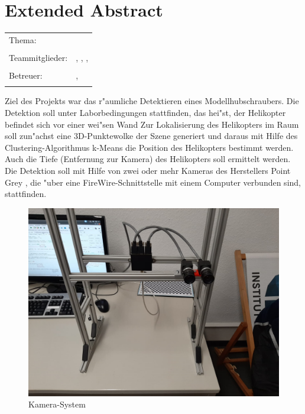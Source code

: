 \chapter*{Extended Abstract}

\begin{center}
	\begingroup
	\renewcommand*{\arraystretch}{1}
	{\makeatletter	
		\begin{tabular}{p{3.2cm}p{9.6cm}}
			Thema: & \thema \\
			& \\
			Teammitglieder: & \verfasserA, \verfasserB, 
			\verfasserC, \verfasserD\\
			& \\
			Betreuer: & \hoschschule \newline \institut \newline \prueferA, \prueferB \\
			& \\
		\end{tabular}
		
		\makeatother}
	\endgroup
\end{center}

\bigskip

\noindent
Ziel des Projekts war das r"aumliche Detektieren eines Modellhubschraubers. Die Detektion soll unter Laborbedingungen stattfinden, das hei"st, der Helikopter befindet sich vor einer wei"sen Wand
Zur Lokalisierung des Helikopters im Raum soll zun"achst eine 3D-Punktewolke der Szene generiert und daraus mit Hilfe des Clustering-Algorithmus k-Means die Position des Helikopters bestimmt werden. Auch die Tiefe (Entfernung zur Kamera) des Helikopters soll ermittelt werden. Die Detektion soll mit Hilfe von zwei oder mehr Kameras des Herstellers Point Grey , die "uber eine FireWire-Schnittstelle mit einem Computer verbunden sind, stattfinden.

\begin{figure}[H]
	\includegraphics[scale=0.3]{bilder/camerasystem}
	\caption[Kamera-System]{Kamera-System}
\end{figure}

